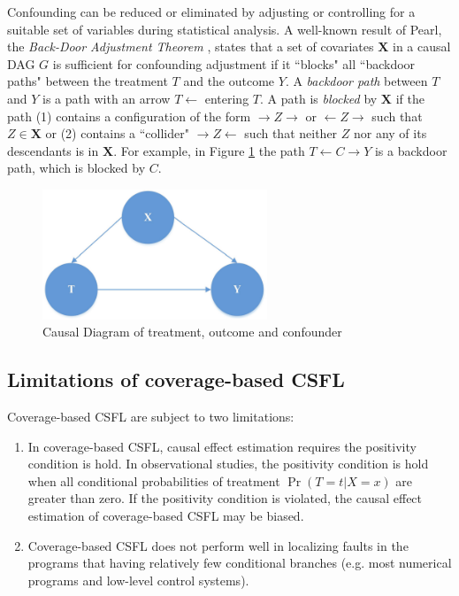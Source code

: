 Confounding can be reduced or eliminated by adjusting or controlling for a suitable set of variables during statistical analysis.  A well-known result of Pearl, the {\it Back-Door Adjustment Theorem} \cite{pearl2000models}, states that a set of covariates $\mathbf{X}$ in a causal DAG $G$ is sufficient for confounding adjustment if it ``blocks" all ``backdoor paths" between the treatment $T$ and the outcome $Y$.  A {\it backdoor path} between $T$ and $Y$ is a path with an arrow $T \leftarrow$ entering $T$.  A path is {\it blocked} by $\pmb{X}$ if the path (1) contains a configuration of the form $\rightarrow Z \rightarrow$ or $\leftarrow Z \rightarrow$ such that  $Z \in \mathbf{X}$ or (2) contains a ``collider" $\rightarrow Z \leftarrow$  such that neither $Z$ nor any of its descendants is in $\mathbf{X}$.  For example, in Figure \ref{fig2.2} the path $T \leftarrow C \rightarrow Y$ is a backdoor path, which is blocked by $C$.

\begin{figure}[htb!]
\vspace{0em}
\begin{center}
\includegraphics[width=0.6\textwidth]{chapter2_CausalDAG1.pdf}
\vspace {0em}\caption{Causal Diagram of treatment, outcome and confounder} \label{fig2.2}
\end{center}
\vspace {0em}
\end{figure}

\subsection{Limitations of coverage-based CSFL}
Coverage-based CSFL are subject to two limitations:
\begin{enumerate}
\item In coverage-based CSFL, causal effect estimation requires the positivity condition is hold. In observational studies, the positivity condition is hold when all conditional probabilities of treatment $\Pr (T = t|X = x) $ are greater than zero. If the positivity condition is violated, the causal effect estimation of coverage-based CSFL may be biased.
\item Coverage-based CSFL does not perform well in localizing faults in the programs that having relatively few conditional branches (e.g. most numerical programs and low-level control systems).
\end{enumerate}  

